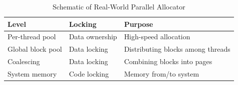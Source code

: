 \begin{table}[tbp]
\small
\centering
\renewcommand*{\arraystretch}{1.25}
\begin{tabularx}{\twocolumnwidth}{ll>{\raggedright\arraybackslash}X}
\toprule
Level	& Locking & Purpose \\
\midrule
Per-thread pool	  & Data ownership & High-speed allocation \\
Global block pool & Data locking   & Distributing blocks among threads \\
Coalescing	  & Data locking   & Combining blocks into pages \\
System memory	  & Code locking   & Memory from/to system \\
\bottomrule
\end{tabularx}
\caption{Schematic of Real-World Parallel Allocator}
\label{fig:app:questions:Schematic of Real-World Parallel Allocator}
\end{table}



